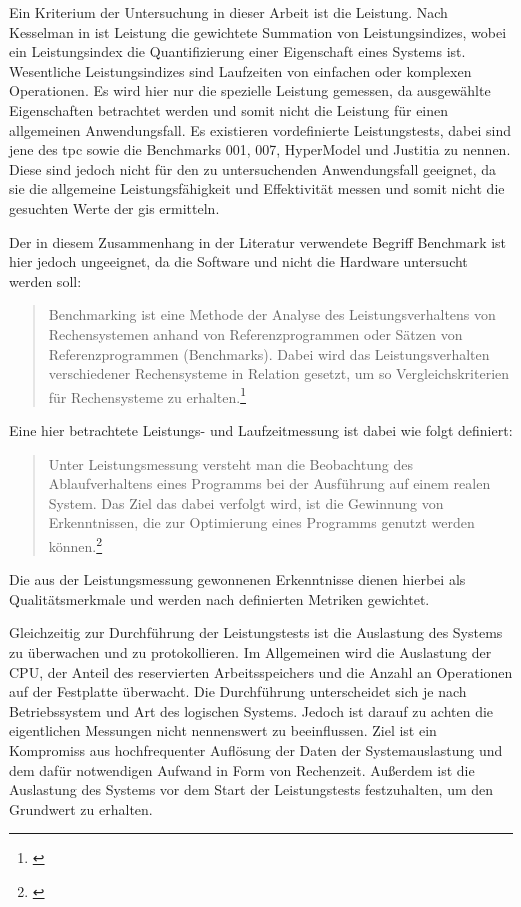 \label{Leistungstests}
Ein Kriterium der Untersuchung in dieser Arbeit ist die Leistung.
Nach Kesselman in \cite[S.20]{book:Leistungsanalyse} ist Leistung die gewichtete Summation von Leistungsindizes, wobei ein Leistungsindex die Quantifizierung einer Eigenschaft eines Systems ist.
Wesentliche Leistungsindizes sind Laufzeiten von einfachen oder komplexen Operationen.
Es wird hier nur die spezielle Leistung gemessen, da ausgewählte Eigenschaften betrachtet werden und somit nicht die Leistung für einen allgemeinen Anwendungsfall.
Es existieren vordefinierte Leistungstests, dabei sind jene des \Gls{tpc} sowie die Benchmarks 001, 007, HyperModel und Justitia zu nennen.
Diese sind jedoch nicht für den zu untersuchenden Anwendungsfall geeignet, da sie die allgemeine Leistungsfähigkeit und Effektivität messen und somit nicht die gesuchten Werte der \Gls{gis} ermitteln.

Der in diesem Zusammenhang in der Literatur verwendete Begriff Benchmark ist hier jedoch ungeeignet, da die Software und nicht die Hardware untersucht werden soll:
\begin {quote}
Benchmarking ist eine Methode der Analyse des Leistungsverhaltens von Rechensystemen anhand von Referenzprogrammen oder Sätzen von Referenzprogrammen (Benchmarks). Dabei wird das Leistungsverhalten verschiedener Rechensysteme in Relation gesetzt, um so Vergleichskriterien  für Rechensysteme zu erhalten.\footnote{\cite[S.24]{book:Leistungsanalyse}}
\end{quote}
Eine hier betrachtete Leistungs- und Laufzeitmessung ist dabei wie folgt definiert:
\begin {quote}
Unter Leistungsmessung versteht man die Beobachtung des Ablaufverhaltens eines Programms bei der Ausführung auf einem realen System. Das Ziel das dabei verfolgt wird, ist die Gewinnung von Erkenntnissen, die zur Optimierung eines Programms genutzt werden können.\footnote{\cite[S.28]{book:Leistungsanalyse}}
\end{quote}
Die aus der Leistungsmessung gewonnenen Erkenntnisse dienen hierbei als Qualitätsmerkmale und werden nach definierten Metriken gewichtet.

Gleichzeitig zur Durchführung der Leistungstests ist die Auslastung des Systems zu überwachen und zu protokollieren.
Im Allgemeinen wird die Auslastung der CPU, der Anteil des reservierten Arbeitsspeichers und die Anzahl an Operationen auf der Festplatte überwacht.
Die Durchführung unterscheidet sich je nach Betriebssystem und Art des logischen Systems.
Jedoch ist darauf zu achten die eigentlichen Messungen nicht nennenswert zu beeinflussen.
Ziel ist ein Kompromiss aus hochfrequenter Auflösung der Daten der Systemauslastung und dem dafür notwendigen Aufwand in Form von Rechenzeit.
Außerdem ist die Auslastung des Systems vor dem Start der Leistungstests festzuhalten, um den Grundwert zu erhalten.